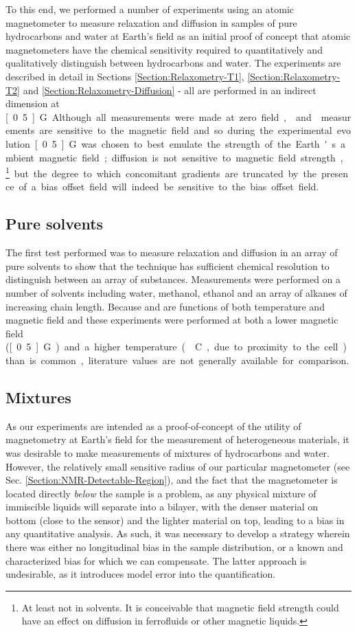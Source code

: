 \documentclass[PaulGanssle-Thesis.tex]{subfiles}
\begin{document}
To this end, we performed a number of experiments using an atomic magnetometer to measure relaxation and diffusion in samples of pure hydrocarbons and water at Earth's field as an initial proof of concept that atomic magnetometers have the chemical sensitivity required to quantitatively and qualitatively distinguish between hydrocarbons and water. The experiments are described in detail in Sections \ref{Section:Relaxometry-T1}, \ref{Section:Relaxometry-T2} and \ref{Section:Relaxometry-Diffusion} - all are performed in an indirect dimension at \unit[0.5]{G}. Although all measurements were made at zero field, \slrel{} and \ssrel{} measurements are sensitive to the magnetic field and so during the experimental evolution \unit[0.5]{G} was chosen to best emulate the strength of the Earth's ambient magnetic field; diffusion is not sensitive to magnetic field strength,\footnote{At least not in solvents. It is conceivable that magnetic field strength could have an effect on diffusion in ferrofluids or other magnetic liquids.} but the degree to which concomitant gradients are truncated by the presence of a bias offset field will indeed be sensitive to the bias offset field.

\subsection{Pure solvents}
\label{relaxometry.hydrocarbons.pure}
The first test performed was to measure relaxation and diffusion in an array of pure solvents to show that the technique has sufficient chemical resolution to distinguish between an array of substances. Measurements were performed on a number of solvents including water, methanol, ethanol and an array of alkanes of increasing chain length. Because \slrel{} and \ssrel{} are functions of both temperature and magnetic field and these experiments were performed at both a lower magnetic field (\unit[0.5]{G}) and a higher temperature (\unit[37]{\degsym C}, due to proximity to the cell) than is common, literature values are not generally available for comparison. 

\subsection{Mixtures}
\label{Section:Relaxation-Diffusion-Hydrocarbons-Mixtures}
As our experiments are intended as a proof-of-concept of the utility of magnetometry at Earth's field for the measurement of heterogeneous materials, it was desirable to make measurements of mixtures of hydrocarbons and water. However, the relatively small sensitive radius of our particular magnetometer (see Sec. \ref{Section:NMR-Detectable-Region}), and the fact that the magnetometer is located directly \textit{below} the sample is a problem, as any physical mixture of immiscible liquids will separate into a bilayer, with the denser material on bottom (close to the sensor) and the lighter material on top, leading to a bias in any quantitative analysis. As such, it was necessary to develop a strategy wherein there was either no longitudinal bias in the sample distribution, or a known and characterized bias for which we can compensate. The latter approach is undesirable, as it introduces model error into the quantification.
\end{document}
